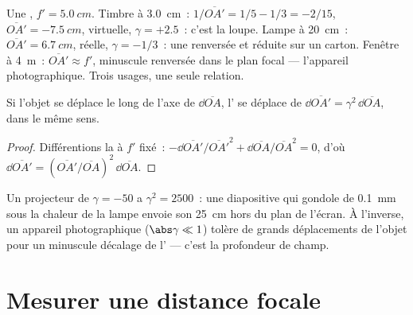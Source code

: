 \begin{example}\label{ex:b1:mirrors-thin-lenses:lensuses}
Une , $f' = \qty{5.0}{cm}$. Timbre à \qty{3.0}{cm}~:
$1/\overline{OA'} = 1/5 - 1/3 = -2/15$, $\overline{OA'} = \qty{-7.5}{cm}$,
virtuelle, $\gamma = +2.5$~: c'est la loupe. Lampe à \qty{20}{cm}~:
$\overline{OA'} = \qty{6.7}{cm}$, réelle, $\gamma = -1/3$~: une 
renversée et réduite sur un carton. Fenêtre à \qty{4}{m}~: $\overline{OA'}
\approx f'$, minuscule  renversée dans le plan focal --- l'appareil
photographique. Trois usages, une seule relation.
\end{example}

\begin{proposition}\label{prop:b1:mirrors-thin-lenses:longitudinal}
Si l'objet se déplace le long de l'axe de $\dd\overline{OA}$, l' se
déplace de $\dd\overline{OA'} = \gamma^2\,\dd\overline{OA}$, dans le
même sens.
\end{proposition}

\begin{proof}
Différentions la  à $f'$ fixé~:
$-\dd\overline{OA'}/\overline{OA'}^2 + \dd\overline{OA}/\overline{OA}^2 = 0$,
d'où $\dd\overline{OA'} = (\overline{OA'}/\overline{OA})^2\,\dd\overline{OA}$.
\end{proof}

\begin{remark}\label{rem:b1:mirrors-thin-lenses:depth}
Un projecteur de $\gamma = -50$ a $\gamma^2 = 2500$~: une diapositive
qui gondole de \qty{0.1}{mm} sous la chaleur de la lampe envoie son
 \qty{25}{cm} hors du plan de l'écran. À l'inverse, un appareil
photographique ($\abs\gamma
\ll 1$) tolère de grands déplacements de l'objet pour un minuscule
décalage de l' --- c'est la profondeur de champ.
\end{remark}

\section{Mesurer une distance focale}

